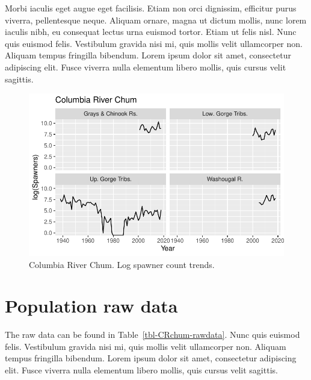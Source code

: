 \documentclass[
  letterpaper,
  oneside,
  open=any]{scrbook}
\begin{document}
Morbi iaculis eget augue eget facilisis. Etiam non orci dignissim,
efficitur purus viverra, pellentesque neque. Aliquam ornare, magna ut
dictum mollis, nunc lorem iaculis nibh, eu consequat lectus urna euismod
tortor. Etiam ut felis nisl. Nunc quis euismod felis. Vestibulum gravida
nisi mi, quis mollis velit ullamcorper non. Aliquam tempus fringilla
bibendum. Lorem ipsum dolor sit amet, consectetur adipiscing elit. Fusce
viverra nulla elementum libero mollis, quis cursus velit sagittis.

\begin{figure}

{\centering \includegraphics{text/Chapter1_files/figure-pdf/fig-CRchum-status-1.pdf}

}

\caption{\label{fig-CRchum-status}Columbia River Chum. Log spawner count
trends.}

\end{figure}

\hypertarget{population-raw-data}{%
\section{Population raw data}\label{population-raw-data}}

The raw data can be found in Table~\ref{tbl-CRchum-rawdata}. Nunc quis
euismod felis. Vestibulum gravida nisi mi, quis mollis velit ullamcorper
non. Aliquam tempus fringilla bibendum. Lorem ipsum dolor sit amet,
consectetur adipiscing elit. Fusce viverra nulla elementum libero
mollis, quis cursus velit sagittis.
\end{document}
